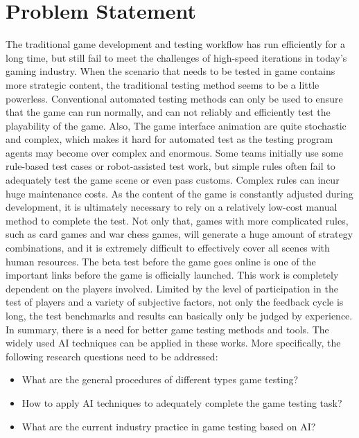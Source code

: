 \documentclass[11pt,en,authoryear]{elegantpaper}
\begin{document}
\section{Problem Statement}
\noindent
The traditional game development and testing workflow has run efficiently for a long time, but still fail to meet the challenges of high-speed iterations in today's gaming industry.
When the scenario that needs to be tested in game contains more strategic content, the traditional testing method seems to be a little powerless. Conventional automated testing methods can only be used to ensure that the game can run normally, and can not reliably and efficiently test the playability of the game. Also, The game interface animation are quite stochastic and complex, which makes it hard for automated test as the testing program agents may become over complex and enormous. Some teams initially use some rule-based test cases or robot-assisted test work, but simple rules often fail to adequately test the game scene or even pass customs. Complex rules can incur huge maintenance costs. As the content of the game is constantly adjusted during development, it is ultimately necessary to rely on a relatively low-cost manual method to complete the test. Not only that, games with more complicated rules, such as card games and war chess games, will generate a huge amount of strategy combinations, and it is extremely difficult to effectively cover all scenes with human resources. The beta test before the game goes online is one of the important links before the game is officially launched. This work is completely dependent on the players involved. Limited by the level of participation in the test of players and a variety of subjective factors, not only the feedback cycle is long, the test benchmarks and results can basically only be judged by experience. In summary, there is a need for better game testing methods and tools. The widely used AI techniques can be applied in these works. More specifically, the following research questions need to be addressed:
\begin{itemize}
    \item What are the general procedures of different types game testing?
    \item How to apply AI techniques to adequately complete the game testing task?
    \item What are the current industry practice in game testing based on AI?
\end{itemize}
\end{document}
